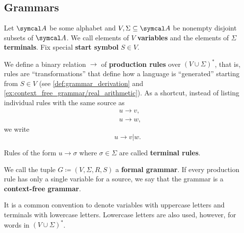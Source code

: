 \subsection{Grammars}\label{subsec:grammars}

\begin{definition}\label{def:grammar}\cite[definition 2.2]{Sipser2013}
  Let \( \Cal{A} \) be some alphabet and \( V, \Sigma \subseteq \Cal{A} \) be nonempty disjoint subsets of \( \Cal{A} \). We call elements of \( V \) \textbf{variables} and the elements of \( \Sigma \) \textbf{terminals}. Fix special \textbf{start symbol} \( S \in V \).

  We define a binary relation \( \to \) of \textbf{production rules} over \( (V \cup \Sigma)^* \), that is, rules are \enquote{transformations} that define how a language is \enquote{generated} starting from \( S \in V \) (see \cref{def:grammar_derivation} and \cref{ex:context_free_grammar/real_arithmetic}). As a shortcut, instead of listing individual rules with the same source as
  \begin{align*}
    &u \to v, \\
    &u \to w,
  \end{align*}
  we write
  \begin{equation*}
    u \to v | w.
  \end{equation*}

  Rules of the form \( u \to \sigma \) where \( \sigma \in \Sigma \) are called \textbf{terminal rules}.

  We call the tuple \( G \coloneqq (V, \Sigma, R, S) \) a \textbf{formal grammar}. If every production rule has only a single variable for a source, we say that the grammar is a \textbf{context-free grammar}.
\end{definition}

\begin{remark}\label{note:grammar_symbol_case}
  It is a common convention to denote variables with uppercase letters and terminals with lowercase letters. Lowercase letters are also used, however, for words in \( (V \cup \Sigma)^* \).
\end{remark}


